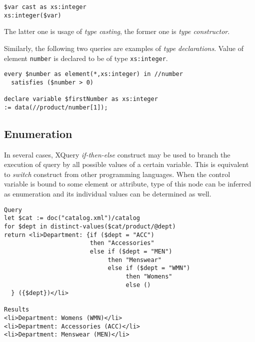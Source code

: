 \begin{verbatim}
$var cast as xs:integer
xs:integer($var)
\end{verbatim}

The latter one is usage of \emph{type casting}, the former one is \emph{type constructor}.

Similarly, the following two queries are examples of \emph{type declarations}. Value of element \texttt{number} is declared to be of type \texttt{xs:integer}.

\begin{verbatim}
every $number as element(*,xs:integer) in //number
  satisfies ($number > 0) 

declare variable $firstNumber as xs:integer 
:= data(//product/number[1]); 
\end{verbatim}


\subsection{Enumeration}
In several cases, XQuery \emph{if-then-else} construct may be used to branch the execution of query by all possible values of a certain variable. This is equivalent to \emph{switch} construct from other programming languages. When the control variable is bound to some element or attribute, type of this node can be inferred as enumeration and its individual values can be determined as well.

\begin{verbatim}
Query
let $cat := doc("catalog.xml")/catalog 
for $dept in distinct-values($cat/product/@dept) 
return <li>Department: {if ($dept = "ACC") 
                        then "Accessories" 
                        else if ($dept = "MEN") 
                             then "Menswear" 
                             else if ($dept = "WMN") 
                                  then "Womens" 
                                  else () 
  } ({$dept})</li> 

Results 
<li>Department: Womens (WMN)</li> 
<li>Department: Accessories (ACC)</li> 
<li>Department: Menswear (MEN)</li> 
\end{verbatim}

